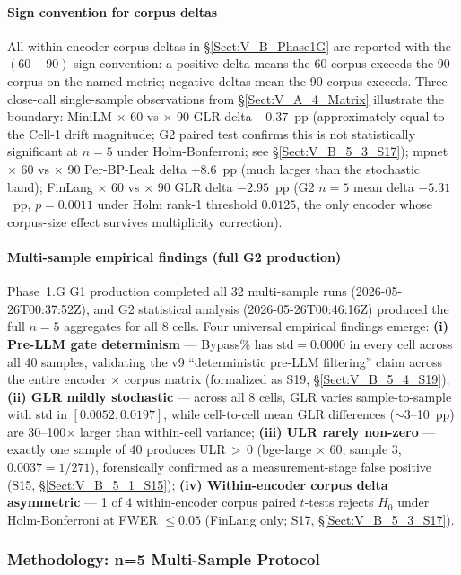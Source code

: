 \documentclass[journal]{IEEEtran}
\begin{document}
\paragraph{Sign convention for corpus deltas}
All within-encoder corpus deltas in \S\ref{Sect:V_B_Phase1G} are reported with the $(60{-}90)$ sign convention: a positive delta means the 60-corpus exceeds the 90-corpus on the named metric; negative deltas mean the 90-corpus exceeds. Three close-call single-sample observations from \S\ref{Sect:V_A_4_Matrix} illustrate the boundary: MiniLM $\times$ 60 vs $\times$ 90 GLR delta $-0.37$~pp (approximately equal to the Cell-1 drift magnitude; G2 paired test confirms this is not statistically significant at $n{=}5$ under Holm-Bonferroni; see \S\ref{Sect:V_B_5_3_S17}); mpnet $\times$ 60 vs $\times$ 90 Per-BP-Leak delta $+8.6$~pp (much larger than the stochastic band); FinLang $\times$ 60 vs $\times$ 90 GLR delta $-2.95$~pp (G2 $n{=}5$ mean delta $-5.31$~pp, $p{=}0.0011$ under Holm rank-1 threshold $0.0125$, the only encoder whose corpus-size effect survives multiplicity correction).

\paragraph{Multi-sample empirical findings (full G2 production)}
Phase~1.G G1 production completed all 32 multi-sample runs (2026-05-26T00:37:52Z), and G2 statistical analysis (2026-05-26T00:46:16Z) produced the full $n{=}5$ aggregates for all 8 cells. Four universal empirical findings emerge: \textbf{(i) Pre-LLM gate determinism} --- Bypass\% has $\text{std}{=}0.0000$ in every cell across all 40 samples, validating the v9 ``deterministic pre-LLM filtering'' claim across the entire encoder $\times$ corpus matrix (formalized as S19, \S\ref{Sect:V_B_5_4_S19}); \textbf{(ii) GLR mildly stochastic} --- across all 8 cells, GLR varies sample-to-sample with std in $[0.0052, 0.0197]$, while cell-to-cell mean GLR differences ($\sim$3--10~pp) are 30--100$\times$ larger than within-cell variance; \textbf{(iii) ULR rarely non-zero} --- exactly one sample of 40 produces ULR\,$>$\,0 (bge-large $\times$ 60, sample 3, $0.0037{=}1/271$), forensically confirmed as a measurement-stage false positive (S15, \S\ref{Sect:V_B_5_1_S15}); \textbf{(iv) Within-encoder corpus delta asymmetric} --- 1 of 4 within-encoder corpus paired $t$-tests rejects $H_0$ under Holm-Bonferroni at FWER $\leq 0.05$ (FinLang only; S17, \S\ref{Sect:V_B_5_3_S17}).

\subsubsection{Methodology: n=5 Multi-Sample Protocol}
\label{Sect:V_B_2_Methodology}
\end{document}

